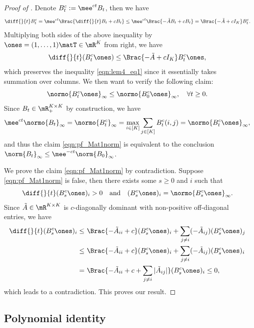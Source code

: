 \documentclass[11pt]{article}
\begin{document}
\begin{proof}[Proof of ]
Denote $B_t^c := \mee^{c t} B_t$, then we have
\begin{equation}\label{eqn:lem4_eq1}
    \diff{}{t} B_t^c = \mee^{c t} \Brac{ \diff{}{t} B_t + c B_t } \le \mee^{c t} \Brac{ - \tilde{A} B_t + c B_t } = \Brac{ - \tilde{A} + c I_K } B_t^c.
\end{equation}
Multiplying both sides of the above inequality by $\ones = (1,\dots,1)\matT \in \mR^K$ from right, we have
\[
    \diff{}{t} ( B_t^c \ones ) \le \Brac{ - \tilde{A}  + c I_K } B_t^c \ones,
\]
which preserves the inequality \eqref{eqn:lem4_eq1} since it essentially takes summation over columns.%
We then want to verify the following claim:
\begin{equation}    \label{eqn:pf_Mat1norm}
   \normo{ B_t^c \ones }_\infty \le  \normo{ B^c_0 \ones }_\infty, \quad  \forall t \ge 0.
\end{equation}
Since $B_t \in \mR_+^{K\times K}$ by construction, we have
\[
    \mee^{c t} \normo{B_t}_\infty = \normo{B_t^c}_\infty = \max_{i\in[K]} \sum_{j \in [K]} B_t^c(i,j) = \normo{ B_t^c \ones }_\infty,
\]
and thus the claim \eqref{eqn:pf_Mat1norm} is equivalent to the conclusion $\norm{B_t}_\infty \le \mee^{-c t} \norm{B_0}_\infty$.


We prove the claim \eqref{eqn:pf_Mat1norm} by contradiction. Suppose \eqref{eqn:pf_Mat1norm} is false, then there exists some $s\ge 0$ and $i$ such that
\[
    \diff{}{t} (B^c_{s} \ones)_i  > 0 \quad \text{and}\quad (B^c_{s} \ones)_i = \normo{ B^c_{s} \ones }_\infty. 
\]
Since $\tilde{A} \in \mR^{K\times K}$ is $c$-diagonally dominant with non-positive off-diagonal entries, we have
\begin{align*}
    \diff{}{t} (B^c_{s} \ones)_i \le~& \Brac{ - \tilde{A}_{ii} + c } (B^c_{s} \ones)_i + \sum_{j\neq i} (-\tilde{A}_{ij}) (B^c_{s} \ones)_j  \\
    \le~& \Brac{ - \tilde{A}_{ii} + c } (B^c_{s} \ones)_i + \sum_{j\neq i} (-\tilde{A}_{ij}) (B^c_{s} \ones)_i \\
    =~& \Brac{ - \tilde{A}_{ii} + c + \sum_{j\neq i} |\tilde{A}_{ij}| } (B^c_{s} \ones)_i \le 0,
\end{align*}
which leads to a contradiction. This proves our result. 
\end{proof}





\subsection{Polynomial identity}
\label{app:pk}
\end{document}
